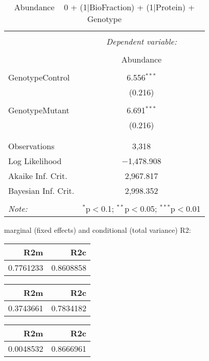 \documentclass[11pt]{report}
\begin{document}
\begin{table}[!htbp] \centering 
  \caption{Abundance ~ 0 + (1|BioFraction) + (1|Protein) + Genotype} 
  \label{} 
\begin{tabular}{@{\extracolsep{5pt}}lc} 
\\[-1.8ex]\hline 
\hline \\[-1.8ex] 
 & \multicolumn{1}{c}{\textit{Dependent variable:}} \\ 
\cline{2-2} 
\\[-1.8ex] & Abundance \\ 
\hline \\[-1.8ex] 
 GenotypeControl & 6.556$^{***}$ \\ 
  & (0.216) \\ 
  & \\ 
 GenotypeMutant & 6.691$^{***}$ \\ 
  & (0.216) \\ 
  & \\ 
\hline \\[-1.8ex] 
Observations & 3,318 \\ 
Log Likelihood & $-$1,478.908 \\ 
Akaike Inf. Crit. & 2,967.817 \\ 
Bayesian Inf. Crit. & 2,998.352 \\ 
\hline 
\hline \\[-1.8ex] 
\textit{Note:}  & \multicolumn{1}{r}{$^{*}$p$<$0.1; $^{**}$p$<$0.05; $^{***}$p$<$0.01} \\ 
\end{tabular} 
\end{table} 
marginal (fixed effects) and conditional (total variance) R2:

\begin{tabular}{r|r}
\hline
R2m & R2c\\
\hline
0.7761233 & 0.8608858\\
\hline
\end{tabular}

\begin{tabular}{r|r}
\hline
R2m & R2c\\
\hline
0.3743661 & 0.7834182\\
\hline
\end{tabular}

\begin{tabular}{r|r}
\hline
R2m & R2c\\
\hline
0.0048532 & 0.8666961\\
\hline
\end{tabular}
\end{document}
